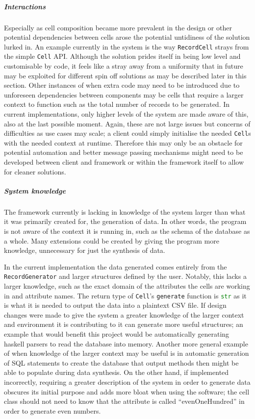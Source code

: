 \subparagraph{Interactions} Especially as cell composition became more prevalent
in the design or other potential dependencies between cells arose the potential
untidiness of the solution lurked in. An example currently in the system is the
way \lstinline{RecordCell} strays from the simple \lstinline{Cell} API. Although
the solution prides itself in being low level and customisable by code, it
feels like a stray away from a uniformity that in future may be exploited for
different spin off solutions as may be described later in this section. Other
instances of when extra code may need to be introduced due to unforeseen
dependencies between components may be cells that require a larger context to
function such as
the total number of records to be generated. In current implementations, only
higher levels of the system are made aware of this, also at the last possible
moment. Again, these are not large issues but concerns of difficulties as
use cases may scale; a client could simply initialise the needed
\lstinline{Cell}s with the needed context at runtime. Therefore this may only
be an obstacle for potential automation and better message passing mechanisms
might need to be developed between client and framework or within the framework
itself to allow for cleaner solutions.

\subparagraph{System knowledge} The framework currently is lacking in knowledge
of the system larger than what it was primarily created for, the generation of
data. In other words, the program is not aware of the context it is running in,
such as the schema of the database as a whole. Many extensions could be created
by giving the program more knowledge, unnecessary for just the synthesis of
data.

In the current implementation the data generated comes entirely from the
\lstinline{RecordGenerator} and larger structures defined by the user. Notably,
this lacks a larger knowledge, such as the exact domain of the attributes the
cells are working in and attribute names. The return type of \lstinline{Cell}'s
\lstinline{generate} function is \lstinline[language=Python]{str} as it is what
it is needed to output the data into a plaintext CSV file. If design changes
were made to give the system a greater knowledge of the larger context and
environment it is contributing to it can generate more useful structures; an
example that would benefit this project would be automatically generating
haskell parsers to read the database into memory. Another more general example of when
knowledge of the larger context may be useful is in automatic generation of SQL
statements to create the database that output methods then might be able to
populate during data synthesis. On the other hand, if implemented incorrectly,
requiring a greater description of the system in order to generate data obscures
its initial purpose and adds more bloat when using the software; the cell class
should not need to know that the attribute is called ``evenOneHundred'' in order
to generate even numbers.

